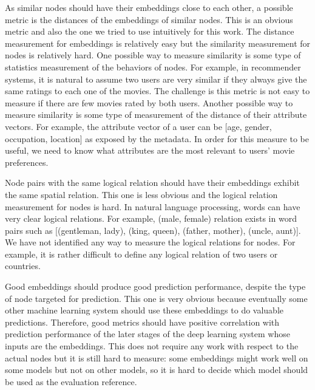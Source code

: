 \documentclass[12pt]{WSUThesis}
\theoremstyle{definition}
\begin{document}
As similar nodes should have their embeddings close to each other, a possible metric is the distances of the embeddings of similar nodes.
This is an obvious metric and also the one we tried to use intuitively for this work.
The distance measurement for embeddings is relatively easy but the similarity measurement for nodes is relatively hard.
One possible way to measure similarity is some type of statistics measurement of the behaviors of nodes.
For example, in recommender systems, it is natural to assume two users are very similar if they always give the same ratings to each one of the movies.
The challenge is this metric is not easy to measure if there are few movies rated by both users.
Another possible way to measure similarity is some type of measurement of the distance of their attribute vectors.
For example, the attribute vector of a user can be [age, gender, occupation, location] as exposed by the metadata.
In order for this measure to be useful, we need to know what attributes are the most relevant to users' movie preferences.

Node pairs with the same logical relation should have their embeddings exhibit the same spatial relation.
This one is less obvious and the logical relation measurement for nodes is hard.
In natural language processing, words can have very clear logical relations.
For example, (male, female) relation exists in word pairs such as [(gentleman, lady), (king, queen), (father, mother), (uncle, aunt)].
We have not identified any way to measure the logical relations for nodes.
For example, it is rather difficult to define any logical relation of two users or countries.

Good embeddings should produce good prediction performance, despite the type of node targeted for prediction.
This one is very obvious because eventually some other machine learning system should use these embeddings to do valuable predictions.
Therefore, good metrics should have positive correlation with prediction performance of the later stages of the deep learning system whose inputs are the embeddings.
This does not require any work with respect to the actual nodes but it is still hard to measure: some embeddings might work well on some models but not on other models, so it is hard to decide which model should be used as the evaluation reference.
\end{document}

